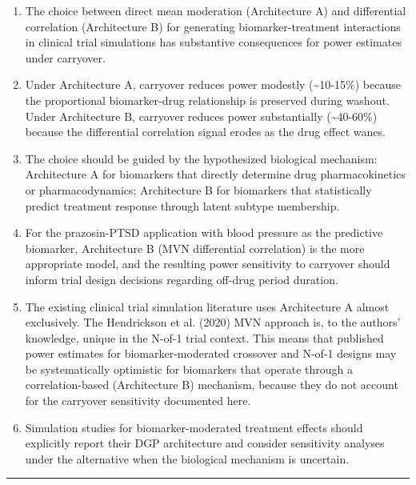 \documentclass[11pt]{article}
\begin{document}
\begin{enumerate}
\item The choice between direct mean moderation (Architecture A) and
  differential correlation (Architecture B) for generating
  biomarker-treatment interactions in clinical trial simulations
  has substantive consequences for power estimates under
  carryover.

\item Under Architecture A, carryover reduces power modestly
  (\textasciitilde{}10-15\%) because the proportional biomarker-drug relationship
  is preserved during washout. Under Architecture B, carryover
  reduces power substantially (\textasciitilde{}40-60\%) because the differential
  correlation signal erodes as the drug effect wanes.

\item The choice should be guided by the hypothesized biological
  mechanism: Architecture A for biomarkers that directly
  determine drug pharmacokinetics or pharmacodynamics;
  Architecture B for biomarkers that statistically predict
  treatment response through latent subtype membership.

\item For the prazosin-PTSD application with blood pressure as the
  predictive biomarker, Architecture B (MVN differential
  correlation) is the more appropriate model, and the resulting
  power sensitivity to carryover should inform trial design
  decisions regarding off-drug period duration.

\item The existing clinical trial simulation literature uses
  Architecture A almost exclusively. The Hendrickson et al.
  (2020) MVN approach is, to the authors' knowledge, unique in the
  N-of-1 trial context. This means that published power
  estimates for biomarker-moderated crossover and N-of-1
  designs may be systematically optimistic for biomarkers
  that operate through a correlation-based (Architecture B)
  mechanism, because they do not account for the carryover
  sensitivity documented here.

\item Simulation studies for biomarker-moderated treatment effects
  should explicitly report their DGP architecture and consider
  sensitivity analyses under the alternative when the biological
  mechanism is uncertain.
\end{enumerate}

\bigskip\noindent\rule{\textwidth}{0.4pt}\bigskip
\end{document}
